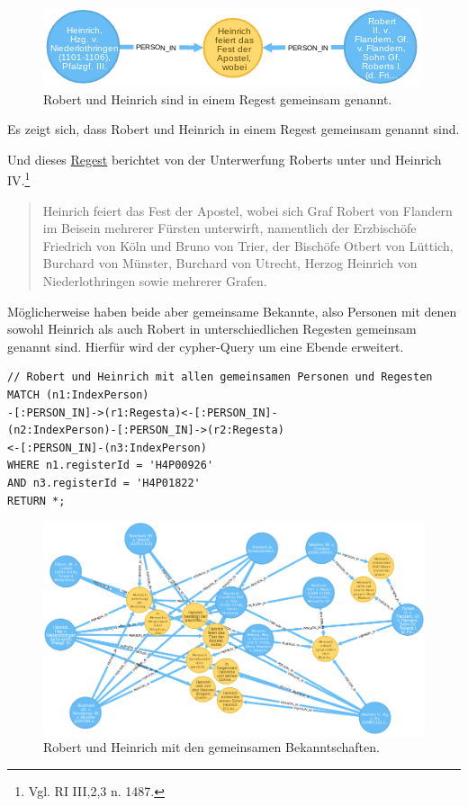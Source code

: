 \documentclass[12pt,ngerman,]{article}
\begin{document}
\begin{figure}
\centering
\includegraphics{Bilder/RI2Graph/RobertundHeinrich.png}
\caption{Robert und Heinrich sind in einem Regest gemeinsam genannt.}
\end{figure}

Es zeigt sich, dass Robert und Heinrich in einem Regest gemeinsam
genannt sind.

Und dieses
\href{http://www.regesta-imperii.de/id/cf75356b-bd0d-4a67-8aeb-3ae27d1dcefa}{Regest}
berichtet von der Unterwerfung Roberts unter und Heinrich IV.\footnote{Vgl.
  RI III,2,3 n. 1487.}

\begin{quote}
Heinrich feiert das Fest der Apostel, wobei sich Graf Robert von
Flandern im Beisein mehrerer Fürsten unterwirft, namentlich der
Erzbischöfe Friedrich von Köln und Bruno von Trier, der Bischöfe Otbert
von Lüttich, Burchard von Münster, Burchard von Utrecht, Herzog Heinrich
von Niederlothringen sowie mehrerer Grafen.
\end{quote}

Möglicherweise haben beide aber gemeinsame Bekannte, also Personen mit
denen sowohl Heinrich als auch Robert in unterschiedlichen Regesten
gemeinsam genannt sind. Hierfür wird der cypher-Query um eine Ebende
erweitert.

\begin{verbatim}
// Robert und Heinrich mit allen gemeinsamen Personen und Regesten
MATCH (n1:IndexPerson)
-[:PERSON_IN]->(r1:Regesta)<-[:PERSON_IN]-
(n2:IndexPerson)-[:PERSON_IN]->(r2:Regesta)
<-[:PERSON_IN]-(n3:IndexPerson)
WHERE n1.registerId = 'H4P00926'
AND n3.registerId = 'H4P01822'
RETURN *;
\end{verbatim}

\begin{figure}
\centering
\includegraphics{Bilder/RI2Graph/RobertundHeinrichMitBrokern.png}
\caption{Robert und Heinrich mit den gemeinsamen Bekanntschaften.}
\end{figure}
\end{document}
